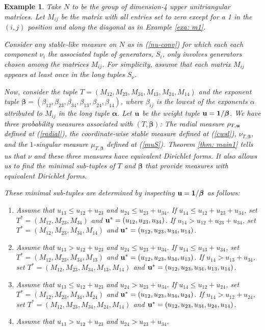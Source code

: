 \documentclass[pdflatex,sn-mathphys-num]{sn-jnl}%
\theoremstyle{thmstyleone}%
\theoremstyle{thmstyletwo}%
\newtheorem{exa}{Example}%
\theoremstyle{thmstylethree}%
\begin{document}
\begin{exa}
\label{exa: m12}
     Take $N$ to be the group of dimension-4 upper unitriangular matrices. Let $M_{ij}$ be the matrix with all entries set to  zero except for a 1 in the $(i,j)$ position and along the diagonal as in Example \ref{exa: m1}.

Consider any stable-like measure on $N$ as in (\ref{nu-conv}) for which each each component $\nu_i$ the associated tuple of generators, $S_i$, only involves generators chosen among the matrices $M_{ij}$. For simplicity, assume that each matrix $M_{ij}$ appears at least once in the long tuples $S_\nu$. 

Now, consider the tuple $T=(M_{12},M_{23},M_{34},M_{13},M_{24},M_{14})$ and the exponent tuple $\boldsymbol{\beta}=(\beta_{12},\beta_{23},\beta_{34},\beta_{13},\beta_{24},\beta_{14})$, where $\beta_{ij}$ is the lowest of the exponents $\alpha$ attributed to $M_{ij}$ in the long tuple $\boldsymbol{\alpha}$. Let $\bf u$
 be the weight tuple $\bf u=1/\boldsymbol{\beta}$.  We have three probability measures associated with $(T,{\boldsymbol\beta})$:
The radial measure $\rho_{T,\bf u}$ defined at (\ref{radial}), the coordinate-wise stable measure defined at (\ref{cwsl}), $\nu_{T,\boldsymbol{\beta}}$, and the $1$-singular measure $\mu_{T,\boldsymbol{\beta}}$ defined at (\ref{muS}). Theorem \ref{thm: main1} tells us that $\nu$ and these three measures have equivalent Dirichlet forms. It also allows us to find the minimal  sub-tuples of $T$ and $\boldsymbol{\beta}$
that provide measures with equivalent Dirichlet forms.

These minimal sub-tuples are determined by inspecting
$\bf u=1/\boldsymbol{\beta}$ as follows:
\begin{enumerate}
\item Assume that $u_{13}\le u_{12}+u_{23}$ and $u_{24}\le u_{23}+u_{34}$. If $u_{14}\le u_{12}+u_{23}+u_{34}$, set $T^*=(M_{12},M_{23},M_{34})$
and ${\bf u}^*=(u_{12},u_{23},u_{34})$. If $u_{14}> u_{12}+u_{23}+u_{34}$, set $T^*=(M_{12},M_{23},M_{34},M_{14})$
and ${\bf u}^*=(u_{12},u_{23},u_{34},u_{14})$.
\item Assume that $u_{13}> u_{12}+u_{23}$ and $u_{24}\le u_{23}+u_{34}$. If $u_{14}\le u_{13}+u_{34}$, set $T^*=(M_{12},M_{23},M_{34},M_{13})$
and ${\bf u}^*=(u_{12},u_{23},u_{34},u_{13})$. If $u_{14}> u_{13}+u_{34}$, set $T^*=(M_{12},M_{23},M_{34},M_{13}, M_{14})$
and ${\bf u}^*=(u_{12},u_{23},u_{34},u_{13},u_{14})$.
\item Assume that $u_{13}\le u_{12}+u_{23}$ and $u_{24}> u_{23}+u_{34}$. If $u_{14}\le u_{12}+u_{24}$, set $T^*=(M_{12},M_{23},M_{34},M_{24})$
and ${\bf u}^*=(u_{12},u_{23},u_{34},u_{24})$. If $u_{14}> u_{12}+u_{24}$, set $T^*=(M_{12},M_{23},M_{34},M_{24}, M_{14})$
and ${\bf u}^*=(u_{12},u_{23},u_{34},u_{24},u_{14})$.
\item Assume that $u_{13}> u_{12}+u_{23}$ and $u_{24}> u_{23}+u_{34}$. 


\end{enumerate}
\end{exa}
\end{document}
